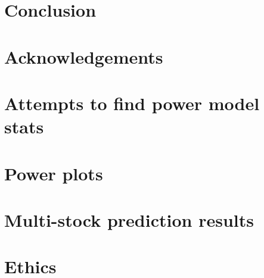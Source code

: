 \documentclass[12pt]{report}
\begin{document}
    \chapter{Conclusion}
    
    
    \chapter*{Acknowledgements}
    
    
    \printbibliography
    
    \appendix
    
    \chapter{Attempts to find power model stats}\label{ch:power-model-eldritch}
    
    
    \chapter{Power plots}\label{ch:power-plots}
    
    
    \chapter{Multi-stock prediction results}\label{ch:multis-pred-res}
    
    
    \chapter{Ethics}
    
\end{document}
